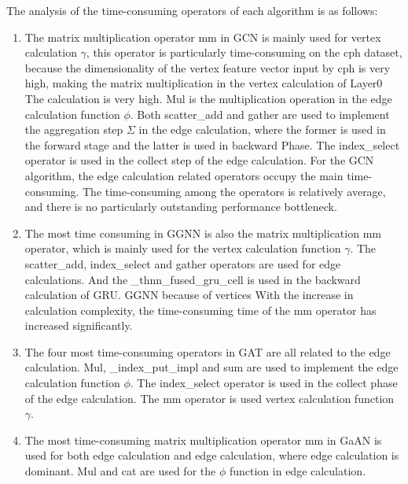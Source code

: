 The analysis of the time-consuming operators of each algorithm is as follows:

\begin{enumerate}
    \item The matrix multiplication operator mm in GCN is mainly used for vertex calculation $\gamma$, 
    this operator is particularly time-consuming on the cph dataset, 
    because the dimensionality of the vertex feature vector input by cph is very high,
    making the matrix multiplication in the vertex calculation of Layer0 The calculation is very high.
    Mul is the multiplication operation in the edge calculation function $\phi$.
    Both scatter\_add and gather are used to implement the aggregation step $\Sigma$ in the edge calculation,
    where the former is used in the forward stage and the latter is used in backward Phase.
    The index\_select operator is used in the collect step of the edge calculation.
    For the GCN algorithm, the edge calculation related operators occupy the main time-consuming.
    The time-consuming among the operators is relatively average, and there is no particularly outstanding performance bottleneck.
    \item The most time consuming in GGNN is also the matrix multiplication mm operator,
    which is mainly used for the vertex calculation function $\gamma$. The scatter\_add, index\_select and gather operators
    are used for edge calculations. And the \_thnn\_fused\_gru\_cell is used in the backward calculation of GRU.
    GGNN because of vertices With the increase in calculation complexity, the time-consuming time of the mm operator has increased significantly.
    \item The four most time-consuming operators in GAT are all related to the edge calculation. 
    Mul, \_index\_put\_impl and sum are used to implement the edge calculation function $\phi$.
    The index\_select operator is used in the collect phase of the edge calculation. 
    The mm operator is used vertex calculation function $\gamma$.
    \item The most time-consuming matrix multiplication operator mm in GaAN is used for both edge calculation and edge calculation,
    where edge calculation is dominant. Mul and cat are used for the $\phi$ function in edge calculation.
\end{enumerate}

